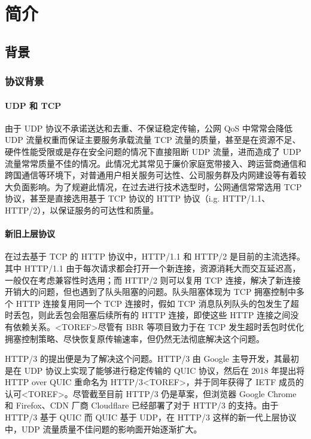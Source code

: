 

\chapter{简介}

\section{背景}

\subsection{协议背景}

\subsubsection{UDP 和 TCP}

由于 UDP 协议不承诺送达和去重\cite{rfc768}、不保证稳定传输，公网 QoS 中常常会降低 UDP 流量权重而保证主要服务承载流量 TCP 流量的质量，甚至是在资源不足、硬件性能受限或是存在安全问题的情况下直接阻断 UDP 流量，进而造成了 UDP 流量常常质量不佳的情况。此情况尤其常见于廉价家庭宽带接入、跨运营商通信和跨国通信等环境下，对普通用户相关服务可达性、公司服务群及内网建设等有着较大负面影响。为了规避此情况，在过去进行技术选型时，公网通信常常选用 TCP 协议，甚至是直接选用基于 TCP 协议的 HTTP 协议（i.g. HTTP/1.1、HTTP/2），以保证服务的可达性和质量。

\subsubsection{新旧上层协议}

在过去基于 TCP 的 HTTP 协议中，HTTP/1.1 和 HTTP/2 是目前的主流选择。其中 HTTP/1.1 由于每次请求都会打开一个新连接，资源消耗大而交互延迟高，一般仅在考虑兼容性时选用；而 HTTP/2 则可以复用 TCP 连接，解决了新连接开销大的问题，但也遇到了队头阻塞的问题。队头阻塞体现为 TCP 拥塞控制中多个 HTTP 连接复用同一个 TCP 连接时，假如 TCP 消息队列队头的包发生了超时丢包，则此丢包会阻塞后续所有的 HTTP 连接，即使这些 HTTP 连接之间没有依赖关系。<TOREF>尽管有 BBR\cite{45646} 等项目致力于在 TCP 发生超时丢包时优化拥塞控制策略、尽快恢复原传输速率，但仍然无法彻底解决这个问题。

HTTP/3 的提出便是为了解决这个问题。HTTP/3 由 Google 主导开发，其最初是在 UDP 协议上实现了能够进行稳定传输的 QUIC 协议，然后在 2018 年提出将 HTTP over QUIC 重命名为 HTTP/3<TOREF>，并于同年获得了 IETF 成员的认可<TOREF>。尽管截至目前 HTTP/3 仍是草案\cite{ietf-quic-http-34}，但浏览器 Google Chrome 和 Firefox、CDN 厂商 Cloudflare 已经部署了对于 HTTP/3 的支持。由于 HTTP/3 基于 QUIC 而 QUIC 基于 UDP，在 HTTP/3 这样的新一代上层协议中，UDP 流量质量不佳问题的影响面开始逐渐扩大。

